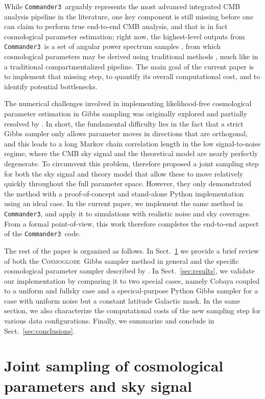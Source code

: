 \documentclass[twocolumn]{../common/aa}
\def\commanderthree{\texttt{Commander3}}
\newcommand{\cosmoglobe}{\textsc{Cosmoglobe}}
\begin{document}
While \commanderthree\ arguably represents the most advanced integrated CMB analysis pipeline in the literature, one key component is still missing before one can claim to perform true end-to-end CMB analysis, and that is in fact cosmological parameter estimation; right now, the highest-level outputs from \commanderthree\ is a set of angular power spectrum samples \citep{bp11}, from which cosmological parameters may be derived using traditional methods \citep{bp12}, much like in a traditional compartmentalized pipeline. The main goal of the current paper is to implement that missing step, to quantify its overall computational cost, and to identify potential bottlenecks.

The numerical challenges involved in implementing likelihood-free cosmological parameter estimation in Gibbs sampling was originally explored and partially resolved by \citet{jewell2009}. In short, the fundamental difficulty lies in the fact that a strict Gibbs sampler only allows parameter moves in directions that are orthogonal, and this leads to a long Markov chain correlation length in the low signal-to-noise regime, where the CMB sky signal and the theoretical model are nearly perfectly degenerate. To circumvent this problem, \citet{racine:2016} therefore proposed a joint sampling step for both the sky signal and theory model that allow these to move relatively quickly throughout the full parameter space. However, they only demonstrated the method with a proof-of-concept and stand-alone Python implementation using an ideal case. In the current paper, we implement the same method in \commanderthree, and apply it to simulations with realistic noise and sky coverages. From a formal point-of-view, this work therefore completes the end-to-end aspect of the \commanderthree\ code. 

The rest of the paper is organized as follows. In Sect.~\ref{sec:methods} we provide a brief review of both the \cosmoglobe\ Gibbs sampler method in general and the specific cosmological parameter sampler described by \citet{racine:2016}. In Sect.~\ref{sec:results}, we validate our implementation by comparing it to two special cases, namely Cobaya coupled to a uniform and fullsky case and a specical-purpose Python Gibbs sampler for a case with uniform noise but a constant latitude Galactic mask. In the same section, we also characterize the computational costs of the new sampling step for various data configurations. Finally, we summarize and conclude in Sect.~\ref{sec:conclusions}.

\section{Joint sampling of cosmological parameters and sky signal}
\label{sec:methods}
\end{document}
